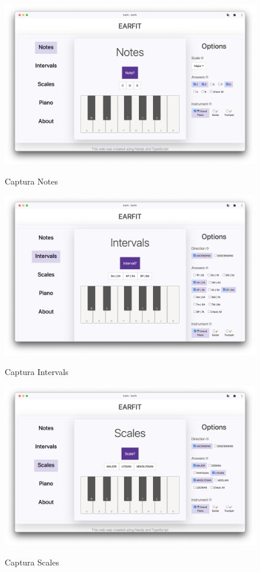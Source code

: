 \documentclass[12pt,twoside,titlepage]{report}
\begin{document}
\begin{figure}[H]
    \centering
    \includegraphics[scale=0.28]{Capturas Earfit/PC/Notes}
    \label{fig:PCNotes}
    \caption{Captura Notes}
\end{figure}

\begin{figure}[H]
    \centering
    \includegraphics[scale=0.28]{Capturas Earfit/PC/Intervals}
    \label{fig:PCIntervals}
    \caption{Captura Intervals}
\end{figure}

\begin{figure}[H]
    \centering
    \includegraphics[scale=0.28]{Capturas Earfit/PC/Scales}
    \label{fig:PCScales}
    \caption{Captura Scales}
\end{figure}
\end{document}
